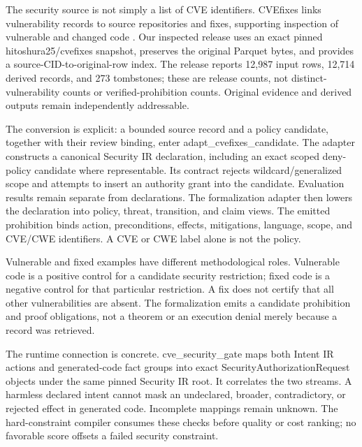 \documentclass{article}
\begin{document}
The security source is not simply a list of CVE identifiers. CVEfixes links vulnerability records to source repositories and fixes, supporting inspection of vulnerable and changed code \citep{cvefixes}. Our inspected release uses an exact pinned hitoshura25/cvefixes snapshot, preserves the original Parquet bytes, and provides a source-CID-to-original-row index. The release reports 12,987 input rows, 12,714 derived records, and 273 tombstones; these are release counts, not distinct-vulnerability counts or verified-prohibition counts. Original evidence and derived outputs remain independently addressable.

The conversion is explicit: a bounded source record and a policy candidate, together with their review binding, enter adapt\_\allowbreak{}cvefixes\_\allowbreak{}candidate. The adapter constructs a canonical Security IR declaration, including an exact scoped deny-policy candidate where representable. Its contract rejects wildcard/generalized scope and attempts to insert an authority grant into the candidate. Evaluation results remain separate from declarations. The formalization adapter then lowers the declaration into policy, threat, transition, and claim views. The emitted prohibition binds action, preconditions, effects, mitigations, language, scope, and CVE/CWE identifiers. A CVE or CWE label alone is not the policy.

Vulnerable and fixed examples have different methodological roles. Vulnerable code is a positive control for a candidate security restriction; fixed code is a negative control for that particular restriction. A fix does not certify that all other vulnerabilities are absent. The formalization emits a candidate prohibition and proof obligations, not a theorem or an execution denial merely because a record was retrieved.

The runtime connection is concrete. cve\_\allowbreak{}security\_\allowbreak{}gate maps both Intent IR actions and generated-code fact groups into exact SecurityAuthorizationRequest objects under the same pinned Security IR root. It correlates the two streams. A harmless declared intent cannot mask an undeclared, broader, contradictory, or rejected effect in generated code. Incomplete mappings remain unknown. The hard-constraint compiler consumes these checks before quality or cost ranking; no favorable score offsets a failed security constraint.
\end{document}
